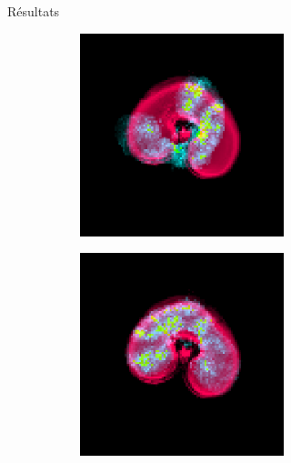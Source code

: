 \documentclass[10pt]{beamer}
\begin{document}
\begin{frame}{Résultats}
\begin{figure}[ht]
\begin{subfigure}[t]{0.33\textwidth}
      \includegraphics[width=0.65\textwidth]{fig/registration_overlay_slice6.png}
      \caption{}
      \label{subfig:}
    \end{subfigure}
    \vspace{-0.2cm}
    \begin{flushright}
      \begin{subfigure}[t]{0.33\textwidth}
        \centering
        \includegraphics[width=0.65\textwidth]{fig/registration_overlay_slice6_dt}
        \caption{}
        \label{subfig:registration_overlay_slice6}
      \end{subfigure}%

    \end{flushright}
  \end{figure}


\end{frame}
\end{document}
